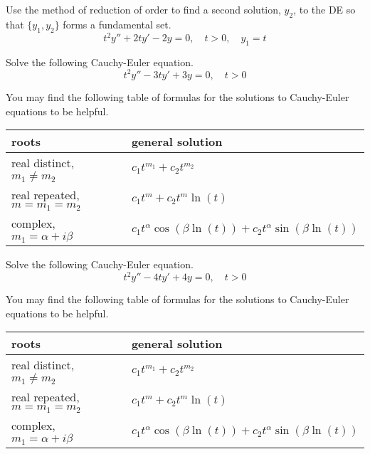 \newpage 

\ifnum {}
\question[8] Use the method of reduction of order to find a second solution, $y_2$, to the DE so that $\{y_1,y_2\}$ forms a fundamental set.
$$t^2y'' + 2ty' - 2y = 0, \quad t > 0, \quad y_1 = t$$
\fi 





\ifnum {}
\question[8] Solve the following Cauchy-Euler equation. 
$$t^2y'' - 3ty' + 3y = 0, \quad t > 0$$

You may find the following table of formulas for the solutions to Cauchy-Euler equations to be helpful. 

\begin{center}
    \begin{tabular}{ p{6.2cm} p{6cm} }
        roots &  general solution 
        \\[2pt] \hline 
        real distinct, $m_1 \ne m_2$ &  $c_1 t^{m_1} + c_2 t^{m_2}$\\       
        real repeated, $m = m_1 = m_2$ & $c_1 t^{m} + c_2 t^m \ln(t)$\\
        complex, $m_1 = \alpha + i \beta$ & $c_1t^{\alpha}\cos(\beta \ln(t)) + c_2t^{\alpha}\sin(\beta \ln (t))$\\[2pt] \hline
    \end{tabular}    
\end{center}

\fi 



\ifnum {}
\question[8] Solve the following Cauchy-Euler equation. 
$$t^2y'' - 4ty' + 4y = 0, \quad t > 0$$

You may find the following table of formulas for the solutions to Cauchy-Euler equations to be helpful. 

\begin{center}
    \begin{tabular}{ p{6.2cm} p{6cm} }
        roots &  general solution 
        \\[2pt] \hline 
        real distinct, $m_1 \ne m_2$ &  $c_1 t^{m_1} + c_2 t^{m_2}$\\       
        real repeated, $m = m_1 = m_2$ & $c_1 t^{m} + c_2 t^m \ln(t)$\\
        complex, $m_1 = \alpha + i \beta$ & $c_1t^{\alpha}\cos(\beta \ln(t)) + c_2t^{\alpha}\sin(\beta \ln (t))$\\[2pt] \hline
    \end{tabular}    
\end{center}

